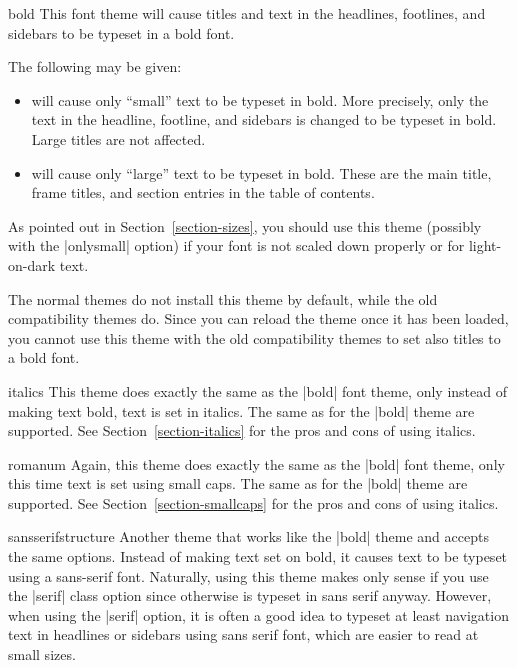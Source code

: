 \begin{fontthemeexample}{bold}
  This font theme will cause titles and text in the headlines,
  footlines, and sidebars to be typeset in a bold font.

  The following  may be given:
  \begin{itemize}
  \item
    will cause only ``small'' text to be typeset in bold. More
    precisely, only the text in the headline, footline, and sidebars
    is changed to be typeset in bold. Large titles are not affected.
  \item
    will cause only ``large'' text to be typeset in bold. These are
    the main title, frame titles, and section entries in the table of
    contents.     
  \end{itemize}

  As pointed out in Section~\ref{section-sizes}, you should use this
  theme (possibly with the |onlysmall| option) if your font is not
  scaled down properly or for light-on-dark text.

  The normal themes do not install this theme by default, while the
  old compatibility themes do. Since you can reload the theme once it
  has been loaded, you cannot use this theme with the old
  compatibility themes to set also titles to a bold font. 
\end{fontthemeexample}

\begin{fontthemeexample}{italics}
  This theme does exactly the same as the |bold| font theme, only
  instead of making text bold, text is set in italics. The same
   as for the |bold| theme are supported. See
  Section~\ref{section-italics} for the pros and cons of using
  italics. 
\end{fontthemeexample}

\begin{fontthemeexample}{romanum}
  Again, this theme does exactly the same as the |bold| font theme,
  only this time text is set using small caps. The same
   as for the |bold| theme are supported. See
  Section~\ref{section-smallcaps} for the pros and cons of using
  italics.  
\end{fontthemeexample}

\begin{fontthemeexample}{sansserifstructure}
  Another theme that works like the |bold| theme and accepts the same
  options. Instead of making text set on bold, it causes text to be
  typeset using a sans-serif font. Naturally, using this theme makes
  only sense if you use the |serif| class option since otherwise is
  typeset in sans serif anyway. However, when using the |serif|
  option, it is often a good idea to typeset at least navigation text
  in headlines or sidebars using sans serif font, which are easier to
  read at small sizes.
\end{fontthemeexample}

